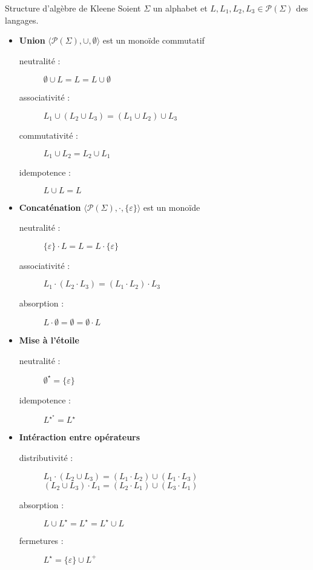 
\begingroup

\begin{frame}{Structure d'algèbre de Kleene}
  Soient $\Sigma$ un alphabet et $L, L_1, L_2, L_3 \in \mathscr{P}(\Sigma)$ des langages. 
 
  \begin{itemize}
  \item \textbf{Union} \hspace{\fill} $\langle \mathscr{P}(\Sigma), \cup, \emptyset \rangle$ est un monoïde commutatif
    \begin{description}
    \item[neutralité :] $\emptyset \cup L = L = L \cup \emptyset$ 
    \item[associativité :] $L_1 \cup (L_2 \cup L_3) = (L_1 \cup L_2) \cup L_3$
    \item[commutativité :] $L_1 \cup L_2 = L_2 \cup L_1$
    \item[idempotence :] $L \cup L = L$
    \end{description}
  \item \textbf{Concaténation} \hspace{\fill} $\langle \mathscr{P}(\Sigma), \cdot, \{\varepsilon\} \rangle$ est un monoïde
    \begin{description}
    \item[neutralité :] $\{\varepsilon\} \cdot L = L = L \cdot \{\varepsilon\}$
    \item[associativité :] $L_1 \cdot (L_2 \cdot L_3) = (L_1 \cdot L_2) \cdot L_3$
    \item[absorption :] $L \cdot \emptyset = \emptyset = \emptyset \cdot L$
    \end{description}
  \item \textbf{Mise à l'étoile} 
    \begin{description}
    \item[neutralité :] $\emptyset^\star = \{\varepsilon\}$
    \item[idempotence :] $L^{\star^\star} = L^\star$
    \end{description}
  \item \textbf{Intéraction entre opérateurs} 
    \begin{description}
    \item[distributivité :] $L_1 \cdot (L_2 \cup L_3) = (L_1\cdot L_2) \cup (L_1 \cdot L_3)$\\
      $(L_2 \cup L_3) \cdot L_1 = (L_2\cdot L_1) \cup (L_3 \cdot L_1)$
    \item[absorption :] $L \cup L^\star = L^\star = L^\star \cup L$
    \item[fermetures :] $L^\star = \{ \varepsilon \} \cup L^+$
    \end{description}
  \end{itemize}
\end{frame}


\endgroup

